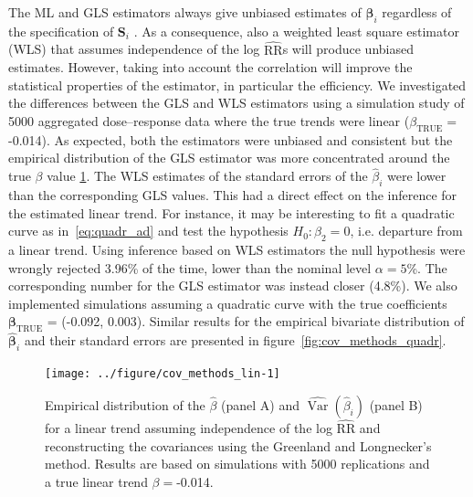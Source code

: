 \documentclass[11pt,a4paper,twoside,openany]{book}\usepackage{knitr}
\DeclareMathOperator{\Var}{Var}
\begin{document}
{The ML and GLS estimators always give unbiased estimates of $\boldsymbol{\beta}_i$ regardless of the specification of $\mathbf{S}_i$ \citep{orsini2006generalized}. As a consequence, also a weighted least square estimator (WLS) that assumes independence of the log $\widehat{\mathrm{RR}}$s will produce unbiased estimates. However, taking into account the correlation will improve the statistical properties of the estimator, in particular the efficiency. 
We investigated the differences between the GLS and WLS estimators using a simulation study of 5000 aggregated dose--response data where the true trends were linear ($\beta_\text{TRUE} =$ -0.014). As expected, both the estimators were unbiased and consistent but the empirical distribution of the GLS estimator was more concentrated around the true $\beta$ value \ref{fig:cov_methods_lin}. The WLS estimates of the standard errors of the $\hat \beta_i$ were lower than the corresponding GLS values. This had a direct effect on the inference for the estimated linear trend. For instance, it may be interesting to fit a quadratic curve as in~\ref{eq:quadr_ad} and test the hypothesis $H_0: \beta_2 = 0$, i.e. departure from a linear trend. Using inference based on WLS estimators the null hypothesis were wrongly rejected 3.96\% of the time, lower than the nominal level $\alpha = 5$\%. The corresponding number for the GLS estimator was instead closer (4.8\%). 
\noindent We also implemented simulations assuming a quadratic curve with the true coefficients $\boldsymbol{\beta}_\text{TRUE}$ = (-0.092, 0.003). Similar results for the empirical bivariate distribution of $ \boldsymbol{\hat \beta}_i$ and their standard errors are presented in figure~\ref{fig:cov_methods_quadr}.

\begin{knitrout}\footnotesize
{}\color{fgcolor}\begin{figure}[ht!]

{\centering \texttt{[image: ../figure/cov\_methods\_lin-1]} 

}

\caption[Empirical distribution of the $\hat \beta$ (panel A) and $\widehat{\Var} \left( \hat \beta_i \right)$ (panel B) for a linear trend assuming independence of the log $\widehat{\mathrm{RR}}$  and reconstructing the covariances using the Greenland and Longnecker’s method]{Empirical distribution of the $\hat \beta$ (panel A) and $\widehat{\Var} \left( \hat \beta_i \right)$ (panel B) for a linear trend assuming independence of the log $\widehat{\mathrm{RR}}$  and reconstructing the covariances using the Greenland and Longnecker’s method. Results are based on simulations with 5000 replications and a true linear trend $\beta = $-0.014.}\label{fig:cov_methods_lin}
\end{figure}



\end{knitrout}}
\end{document}
